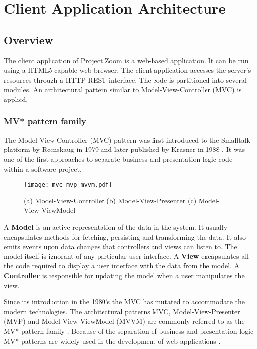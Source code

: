 \chapter{Client Application Architecture}

\section{Overview}
The client application of Project Zoom is a web-based application. It can be run using a HTML5-capable web browser. The client application accesses the server's resources through a HTTP-REST interface. The code is partitioned into several modules. An architectural pattern similar to Model-View-Controller (MVC) is applied.

\subsection{MV* pattern family}
The Model-View-Controller (MVC) pattern was first introduced to the Smalltalk platform by Reenskaug in 1979 \cite{Reenskaug_1979} and later published by Krasner in 1988 \cite{Krasner_1988}. It was one of the first approaches to separate business and presentation logic code within a software project.

\begin{figure}
\texttt{[image: mvc-mvp-mvvm.pdf]}
\caption[Diagrams of Model-View-Controller, Model-View-Presenter and Model-View-ViewModel]{(a) Model-View-Controller \quad (b) Model-View-Presenter \quad (c) Model-View-ViewModel}
\label{fig:MV}
\end{figure}

A \textbf{Model} is an active representation of the data in the system. It usually encapsulates methods for fetching, persisting and transforming the data. It also emits events upon data changes that controllers and views can listen to. The model itself is ignorant of any particular user interface. A \textbf{View} encapsulates all the code required to display a user interface with the data from the model. A \textbf{Controller} is responsible for updating the model when a user manipulates the view. \cite{Krasner_1988} \cite{Gamma_1994}

Since its introduction in the 1980's the MVC has mutated to accommodate the modern technologies. The architectural patterns MVC, Model-View-Presenter (MVP) and Model-View-ViewModel (MVVM) are commonly referred to as the MV* pattern family \cite{Osmani_2012}. Because of the separation of business and presentation logic MV* patterns are widely used in the development of web applications \cite{Takata_2012}.

